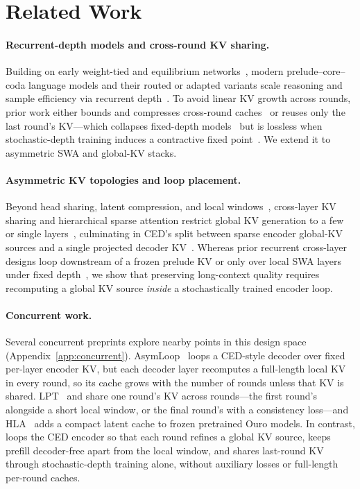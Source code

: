 \section{Related Work}
\label{sec:related}

\paragraph{Recurrent-depth models and cross-round KV sharing.} 
Building on early weight-tied and equilibrium networks~\citep{universal_transformer,albert,deq}, modern prelude--core--coda language models and their routed or adapted variants scale reasoning and sample efficiency via recurrent depth~\citep{saunshi_looped,huginn,parcae,ouro,schwethelm,moeut,relaxed_recursive,mor}. To avoid linear KV growth across rounds, prior work either bounds and compresses cross-round caches~\citep{huginn,mor,plt,melt,lla} or reuses only the last round's KV---which collapses fixed-depth models~\citep{lla,schwethelm_cdb,loopsright2} but is lossless when stochastic-depth training induces a contractive fixed point~\citep{parcae,loopsright2,benice}. We extend it to asymmetric SWA and global-KV stacks.

\paragraph{Asymmetric KV topologies and loop placement.} 
Beyond head sharing, latent compression, and local windows~\citep{mqa,gqa,mla_dsv2,gtagla,longformer,streamingllm}, cross-layer KV sharing and hierarchical sparse attention restrict global KV generation to a few or single layers~\citep{cla,yoco,ramba,hsa_lengthgen}, culminating in CED's split between sparse encoder global-KV sources and a single projected decoder KV~\citep{deepseekv41}. Whereas prior recurrent cross-layer designs loop downstream of a frozen prelude KV or only over local SWA layers under fixed depth~\citep{cart,yocou}, we show that preserving long-context quality requires recomputing a global KV source \emph{inside} a stochastically trained encoder loop.

\paragraph{Concurrent work.}
Several concurrent preprints explore nearby points in this design space (Appendix~\ref{app:concurrent}). AsymLoop~\citep{asymloop} loops a CED-style decoder over fixed per-layer encoder KV, but each decoder layer recomputes a full-length local KV in every round, so its cache grows with the number of rounds unless that KV is shared. LPT~\citep{lpt} and \citet{lstmloop} share one round's KV across rounds---the first round's alongside a short local window, or the final round's with a consistency loss---and HLA~\citep{hla} adds a compact latent cache to frozen pretrained Ouro models. In contrast, \ourmethod loops the CED encoder so that each round refines a global KV source, keeps prefill decoder-free apart from the local window, and shares last-round KV through stochastic-depth training alone, without auxiliary losses or full-length per-round caches.


